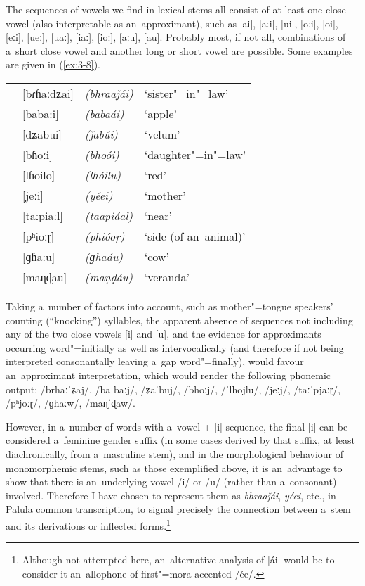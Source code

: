 The sequences of vowels we find in lexical stems all consist of at least one close vowel (also interpretable as an~approximant), such as [ai], [aːi], [ui], [oːi], [oi], [eːi], [ueː], [uaː], [iaː], [ioː], [aːu], [au]. Probably most, if not all, combinations of a~short close vowel and another long or short vowel are possible. Some examples are given in (\ref{ex:3-8}).


\begin{exe}
\extab
\label{ex:3-8}
\begin{tabularx}{\textwidth}{ l l l l }
&
[bɾɦaːdʑai] &
\textit{(bhraaǰái)} &
`sister"=in"=law'\\
&
[baba:i] &
\textit{(babaái)} &
`apple'\\
&
[dʑabui] &
\textit{(ǰabúi)} &
`velum'\\
&
[bɦoːi] &
\textit{(bhoói)} &
`daughter"=in"=law'\\
&
[lɦoilo] &
\textit{(lhóilu)} &
`red'\\
&
[jeːi] &
\textit{(yéei)} &
`mother'\\
&
[taːpiaːl] &
\textit{(taapiáal)} &
`near'\\
&
[pʰioːɽ] &
\textit{(phióoṛ)} &
`side (of an~animal)' \\
&
[ɡɦa:u] &
\textit{(ɡhaáu)} &
`cow'\\
&
[maɳɖau] &
\textit{(maṇḍáu)} &
`veranda'\\
\end{tabularx}
\end{exe}


Taking a~number of factors into account, such as mother"=tongue speakers' counting (``knocking'') syllables, the apparent absence of sequences not including any of the two close vowels [i] and [u], and the evidence for approximants occurring word"=initially as well as intervocalically (and therefore if not being interpreted consonantally leaving a~gap word"=finally), would favour an~approximant interpretation, which would render the following phonemic output: /brhaːˈʑaj/, /baˈbaːj/, /ʑaˈbuj/, /bhoːj/, /ˈlhojlu/, /jeːj/, /taːˈpjaːɽ/, /pʰjoːɽ/, /ɡhaːw/, /maɳˈɖaw/.


However, in a~number of words with a~vowel + [i] sequence, the final [i] can be considered a~feminine gender suffix (in some cases derived by that suffix, at least diachronically, from a~masculine stem), and in the morphological behaviour of monomorphemic stems, such as those exemplified above, it is an~advantage to show that there is an~underlying vowel /i/ or /u/ (rather than a~consonant) involved. Therefore I have chosen to represent them as \textit{bhraaǰái}, \textit{yéei}, etc., in Palula common transcription, to signal precisely the connection between a~stem and its derivations or inflected forms.\footnote{Although not attempted here, an~alternative analysis of [ái] would be to consider it an~allophone of first"=mora accented /ée/.} 


